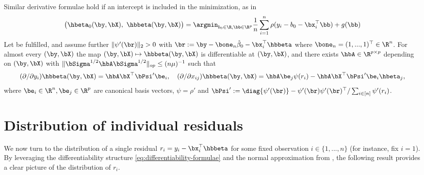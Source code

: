 \documentclass{colt2022} %
\numberwithin{equation}{section}
\begin{document}

\begin{remark}%
    \label{rem:intercept}
    Similar derivative formulae hold if an intercept is included in the minimization, as in
    \begin{equation}
        \bigl(\hbeta_0(\by,\bX), ~\hbbeta(\by,\bX)\bigr) 
        = \argmin_{b_0\in\R, \bb\in\R^p}
        \frac 1 n\sum_{i=1}^n\rho(y_i - b_0 - \bx_i^\top \bb) + g(\bb)
    \end{equation}
    Let  be fulfilled,
    and assume further $ 
        \| \psi' (\br)\|_{2}
        > 0 
    $ with 
    $\br := \by - \bone_{n} \hat\beta_0 - \bx_i^\top \hbbeta$ 
    where  $\bone_n=(1,...,1)^\top\in\R^n$.
    For almost every $(\by,\bX)$ the map $(\by,\bX)\mapsto \hbbeta(\by,\bX)$
    is differentiable at $(\by,\bX)$,
    and there exists $\hbA \in \R^{p\times p}$
    depending on $(\by,\bX)$
    with $\|\bSigma^{1/2} \hbA \bSigma^{1/2}\|_{op} \le (n\mu)^{-1}$
    such that
    \begin{equation}
        (\partial/\partial y_i)
        \hbbeta(\by,\bX)
        = \hbA \bX^\top \bPsi' \be_i,
        \quad
        (\partial/\partial x_{ij})
        \hbbeta(\by,\bX)
        = \hbA \be_j \psi(r_i)
        - \hbA \bX^\top \bPsi' \be_i \hbeta_j
        ,
    \end{equation}
    where $\be_i \in\R^n, \be_j\in\R^p$ are canonical basis vectors,
    $\psi = \rho'$ and $ \bPsi' := \diag\{\psi' (\br)\} - \psi'(\br) \psi'(\br)^{\top} / \sum_{i \in [n]} \psi'(r_i)$.
\end{remark}


\section{Distribution of individual residuals}
\label{sec:residual}

We now turn to the distribution of a single residual $r_i = y_i - \bx_i^\top\hbbeta$ for some fixed observation $i\in\{1,...,n\}$ (for instance, fix $i=1$).
By leveraging the differentiability structure \eqref{eq:differentiability-formulae} and the normal approximation from \cite{bellec_zhang2019second_poincare},
the following result provides a clear picture of the distribution
of $r_i$.
\end{document}
